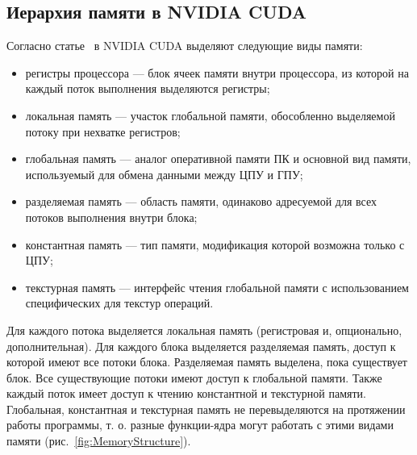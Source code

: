 \subsection{Иерархия памяти в NVIDIA CUDA}

Согласно статье~\cite{Frolov} в NVIDIA CUDA выделяют следующие виды памяти:
\begin{itemize}
\item регистры процессора --- блок ячеек памяти внутри процессора, из которой на каждый поток выполнения выделяются регистры;
\item локальная память --- участок глобальной памяти, обособленно выделяемой потоку при нехватке регистров;
\item глобальная память --- аналог оперативной памяти ПК и основной вид памяти, используемый для обмена данными между ЦПУ и ГПУ;
\item разделяемая память --- область памяти, одинаково адресуемой для всех потоков выполнения внутри блока;
\item константная память --- тип памяти, модификация которой возможна только с ЦПУ;
\item текстурная память --- интерфейс чтения глобальной памяти с использованием специфических для текстур операций.
\end{itemize}

Для каждого потока выделяется локальная память (регистровая и, опционально, дополнительная). Для каждого блока выделяется разделяемая память,
доступ к которой имеют все потоки блока. Разделяемая память выделена,
пока существует блок. Все существующие потоки имеют доступ к глобальной
памяти. Также каждый поток имеет доступ к чтению константной и текстурной
памяти. Глобальная, константная и текстурная память не перевыделяются на
протяжении работы программы, т. о. разные функции-ядра могут работать с
этими видами памяти (рис.~\ref{fig:MemoryStructure}).

